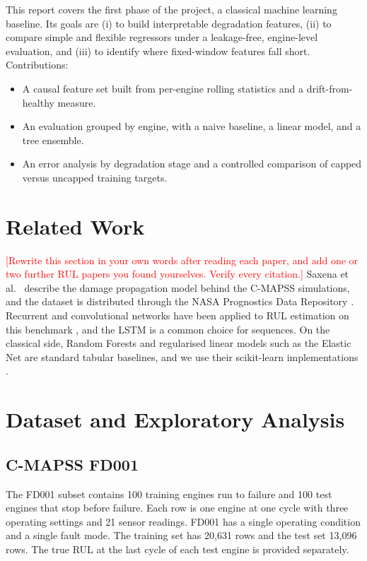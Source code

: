 \documentclass[conference]{IEEEtran}
\newcommand{\TODO}[1]{\textcolor{red}{[#1]}}
\begin{document}
This report covers the first phase of the project, a classical machine learning baseline. Its goals are (i) to build interpretable degradation features, (ii) to compare simple and flexible regressors under a leakage-free, engine-level evaluation, and (iii) to identify where fixed-window features fall short. Contributions:
\begin{itemize}
\item A causal feature set built from per-engine rolling statistics and a drift-from-healthy measure.
\item An evaluation grouped by engine, with a naive baseline, a linear model, and a tree ensemble.
\item An error analysis by degradation stage and a controlled comparison of capped versus uncapped training targets.
\end{itemize}

\section{Related Work}
\TODO{Rewrite this section in your own words after reading each paper, and add one or two further RUL papers you found yourselves. Verify every citation.}
Saxena et al.\ \cite{saxena2008damage} describe the damage propagation model behind the C-MAPSS simulations, and the dataset is distributed through the NASA Prognostics Data Repository \cite{saxena2008cmapss}. Recurrent and convolutional networks have been applied to RUL estimation on this benchmark \cite{heimes2008rnn,babu2016cnn}, and the LSTM \cite{hochreiter1997lstm} is a common choice for sequences. On the classical side, Random Forests \cite{breiman2001rf} and regularised linear models such as the Elastic Net \cite{zou2005en} are standard tabular baselines, and we use their scikit-learn implementations \cite{pedregosa2011sklearn}.

\section{Dataset and Exploratory Analysis}
\subsection{C-MAPSS FD001}
The FD001 subset contains 100 training engines run to failure and 100 test engines that stop before failure. Each row is one engine at one cycle with three operating settings and 21 sensor readings. FD001 has a single operating condition and a single fault mode. The training set has 20{,}631 rows and the test set 13{,}096 rows. The true RUL at the last cycle of each test engine is provided separately.
\end{document}
